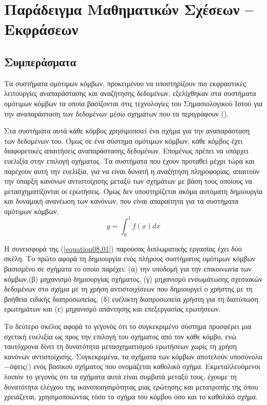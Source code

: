 \chapter{Παράδειγμα Μαθηματικών Σχέσεων -- Εκφράσεων}

\section{Συμπεράσματα}
Τα συστήματα ομότιμων κόμβων, προκειμένου να υποστηρίζουν πιο
εκφραστικές λειτουργίες αναπαράστασης και αναζήτησης δεδομένων,
εξελίχθηκαν στα συστήματα ομότιμων κόμβων τα οποία βασίζονται στις
τεχνολογίες του Σημασιολογικού Ιστού για την αναπαράσταση των
δεδομένων μέσω σχημάτων που τα περιγράφουν ().

Στα συστήματα αυτά κάθε   κόμβος χρησιμοποιεί ένα σχήμα για την 
αναπαράσταση των δεδομένων του. Όμως σε ένα σύστημα ομότιμων
κόμβων, κάθε κόμβος έχει διαφορετικές απαιτήσεις αναπαράστασης
δεδομένων. Επομένως πρέπει να υπάρχει ευελιξία στην επιλογή 
σχήματος. Τα συστήματα που έχουν προταθεί μέχρι τώρα και παρέχουν
αυτή την ευελιξία, για να είναι δυνατή η αναζήτηση πληροφορίας,
απαιτούν την ύπαρξη κανόνων αντιστοίχισης μεταξύ των σχημάτων με
βάση τους οποίους να μετασχηματίζονται οι ερωτήσεις. Όμως δεν
υποστηρίζεται ακόμα αυτόματη δημιουργία και δυναμική ανανέωση των
κανόνων, που είναι απαραίτητα για τα συστήματα ομότιμων κόμβων.
\begin{equation}
	y=\int_0^1f(x)dx
	\label{equation08.01}
\end{equation}

Η συνεισφορά της (\ref{equation08.01}) παρούσας διπλωματικής εργασίας έχει δύο σκέλη. Το
πρώτο αφορά τη δημιουργία ενός πλήρους συστήματος ομότιμων κόμβων
βασισμένο σε σχήματα  το οποίο παρέχει: (α) την υποδομή
για την επικοινωνία των κόμβων,(β) μηχανισμό δημιουργίας σχήματος,
(γ) μηχανισμό ενσωμάτωσης σχεσιακών δεδομένων στο σχήμα με τη
χρήση αντιστοιχίσεων που δημιουργεί ο χρήστης με τη βοήθεια
ειδικής διαπροσωπείας, (δ) ευέλικτη διαπροσωπεία χρήστη για τη
διατύπωση ερωτημάτων και (ε) μηχανισμό απάντησης και επεξεργασίας
ερωτήσεων.

Το δεύτερο σκέλος αφορά το γεγονός ότι το συγκεκριμένο σύστημα
προσφέρει μια σχετική ευελιξία ως προς την επιλογή του σχήματος
από τον κάθε κόμβο, ενώ ταυτόχρονα δίνει τη δυνατότητα
μετασχηματισμού ερωτήσεων χωρίς τη χρήση κανόνων αντιστοίχισης.
Συγκεκριμένα, τα σχήματα των κόμβων αποτελούν
υποσύνολα$-$όψεις$($) ενός βασικού σχήματος που
ονομάζεται καθολικό σχήμα. Εκμεταλλευόμενοι λοιπόν το γεγονός ότι
τα σχήματα αυτά είναι συμβατά μεταξύ τους, έχουμε τη δυνατότητα
ελέγχου της ικανοποιησιμότητας μιας ερώτησης και μετατροπής της
όπου χρειάζεται, χρησιμοποιώντας τόσο το σχήμα του κόμβου όσο και
το καθολικό σχήμα.

